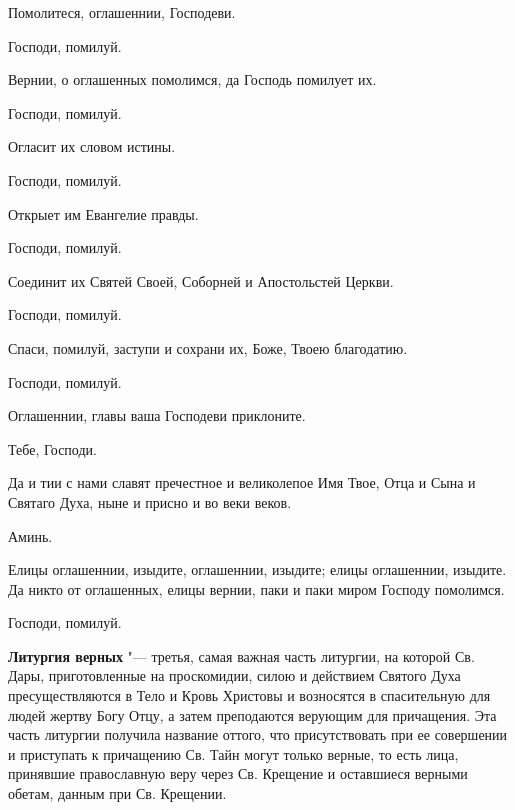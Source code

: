 \begin{mymulticols}

 Помолитеся, оглашеннии, Господеви.

 Господи, помилуй.

 Вернии, о оглашенных помолимся, да Господь помилует их.

 Господи, помилуй.

 Огласит их словом истины.

 Господи, помилуй.

 Открыет им Евангелие правды.

 Господи, помилуй.

 Соединит их Святей Своей, Соборней и Апостольстей Церкви.

 Господи, помилуй.

 Спаси, помилуй, заступи и сохрани их, Боже, Твоею благодатию.

 Господи, помилуй.

 Оглашеннии, главы ваша Господеви приклоните.

 Тебе, Господи.

 Да и тии с нами славят пречестное и великолепое Имя Твое, Отца и Сына и Святаго Духа, ныне и присно и во веки веков.

 Аминь.

 Елицы оглашеннии, изыдите, оглашеннии, изыдите; елицы оглашеннии, изыдите. Да никто от оглашенных, елицы вернии, паки и паки миром Господу помолимся.

 Господи, помилуй.


\end{mymulticols}

\mychapterending


\textbf{Литургия верных} "--- третья, самая важная часть литургии, на которой Св. Дары, приготовленные на проскомидии, силою и действием Святого Духа пресуществляются в Тело и Кровь Христовы и возносятся в спасительную для людей жертву Богу Отцу, а затем преподаются верующим для причащения. Эта часть литургии получила название оттого, что присутствовать при ее совершении и приступать к причащению Св. Тайн могут только верные, то есть лица, принявшие православную веру через Св. Крещение и оставшиеся верными обетам, данным при Св. Крещении.

